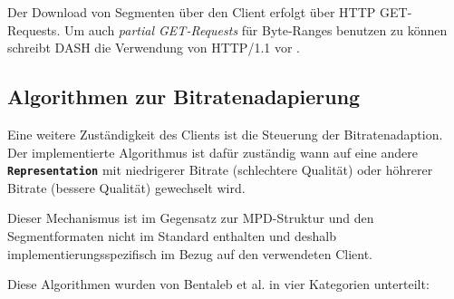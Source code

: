 \documentclass[paper = a4, fontsize = 12pt, parskip = half]{scrartcl} %
\def\elem#1{\texttt{\textbf{#1}}}
\begin{document}
Der Download von Segmenten über den Client erfolgt über HTTP GET-Requests. Um auch \textit{partial GET-Requests} für Byte-Ranges benutzen zu können schreibt DASH die Verwendung von HTTP/1.1 vor \cite{international_organization_for_standardization_isoiec_nodate}.

\subsection{Algorithmen zur Bitratenadapierung}
Eine weitere Zuständigkeit des Clients ist die Steuerung der Bitratenadaption. Der implementierte Algorithmus ist dafür zuständig wann auf eine andere \elem{Representation} mit niedrigerer Bitrate (schlechtere Qualität) oder höhrerer Bitrate (bessere Qualität) gewechselt wird.

Dieser Mechanismus ist im Gegensatz zur MPD-Struktur und den Segmentformaten nicht im Standard enthalten und deshalb implementierungsspezifisch im Bezug auf den verwendeten Client.

Diese Algorithmen wurden von Bentaleb et al. \cite{bentaleb_survey_2019} in vier Kategorien unterteilt:
\end{document}
